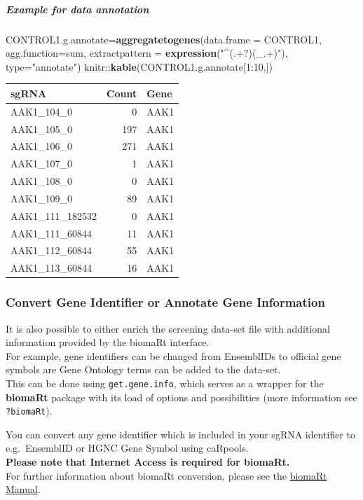 \documentclass[]{article}
\newenvironment{Shaded}{\begin{snugshade}}{\end{snugshade}}
\newcommand{\KeywordTok}[1]{\textcolor[rgb]{0.13,0.29,0.53}{\textbf{{#1}}}}
\newcommand{\DataTypeTok}[1]{\textcolor[rgb]{0.13,0.29,0.53}{{#1}}}
\newcommand{\DecValTok}[1]{\textcolor[rgb]{0.00,0.00,0.81}{{#1}}}
\newcommand{\StringTok}[1]{\textcolor[rgb]{0.31,0.60,0.02}{{#1}}}
\newcommand{\NormalTok}[1]{{#1}}
\let\oldsubparagraph\subparagraph
\renewcommand{\subparagraph}[1]{\oldsubparagraph{#1}\mbox{}}
\begin{document}
\subparagraph{Example for data
annotation}\label{example-for-data-annotation}

\begin{Shaded}
\begin{Highlighting}[]
\NormalTok{CONTROL1.g.annotate=}\KeywordTok{aggregatetogenes}\NormalTok{(}\DataTypeTok{data.frame =} \NormalTok{CONTROL1, }\DataTypeTok{agg.function=}\NormalTok{sum,}
            \DataTypeTok{extractpattern =} \KeywordTok{expression}\NormalTok{(}\StringTok{"^(.+?)(_.+)"}\NormalTok{), }\DataTypeTok{type=}\StringTok{"annotate"}\NormalTok{)}
\NormalTok{knitr::}\KeywordTok{kable}\NormalTok{(CONTROL1.g.annotate[}\DecValTok{1}\NormalTok{:}\DecValTok{10}\NormalTok{,])}
\end{Highlighting}
\end{Shaded}

\begin{longtable}[c]{@{}lrl@{}}
\toprule
sgRNA & Count & Gene\tabularnewline
\midrule
\endhead
AAK1\_104\_0 & 0 & AAK1\tabularnewline
AAK1\_105\_0 & 197 & AAK1\tabularnewline
AAK1\_106\_0 & 271 & AAK1\tabularnewline
AAK1\_107\_0 & 1 & AAK1\tabularnewline
AAK1\_108\_0 & 0 & AAK1\tabularnewline
AAK1\_109\_0 & 89 & AAK1\tabularnewline
AAK1\_111\_182532 & 0 & AAK1\tabularnewline
AAK1\_111\_60844 & 11 & AAK1\tabularnewline
AAK1\_112\_60844 & 55 & AAK1\tabularnewline
AAK1\_113\_60844 & 16 & AAK1\tabularnewline
\bottomrule
\end{longtable}

\subsubsection{Convert Gene Identifier or Annotate Gene
Information}\label{convert-gene-identifier-or-annotate-gene-information}

It is also possible to either enrich the screening data-set file with
additional information provided by the biomaRt interface.\\
For example, gene identifiers can be changed from EnsemblIDs to official
gene symbols are Gene Ontology terms can be added to the data-set.\\
This can be done using \texttt{get.gene.info}, which serves as a wrapper
for the \textbf{biomaRt} package with its load of options and
possibilities (more information see \texttt{?biomaRt}).

You can convert any gene identifier which is included in your sgRNA
identifier to e.g.~EnsemblID or HGNC Gene Symbol using caRpools.\\
\textbf{Please note that Internet Access is required for biomaRt.}\\
For further information about biomaRt conversion, please see the
\href{www.bioconductor.org/packages/release/bioc/vignettes/biomaRt/inst/doc/biomaRt.pdf}{biomaRt
Manual}.
\end{document}
